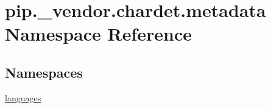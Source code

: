 \hypertarget{namespacepip_1_1__vendor_1_1chardet_1_1metadata}{}\section{pip.\+\_\+vendor.\+chardet.\+metadata Namespace Reference}
\label{namespacepip_1_1__vendor_1_1chardet_1_1metadata}
\subsection*{Namespaces}
\begin{DoxyCompactItemize}
\item 
 \hyperlink{namespacepip_1_1__vendor_1_1chardet_1_1metadata_1_1languages}{languages}
\end{DoxyCompactItemize}

